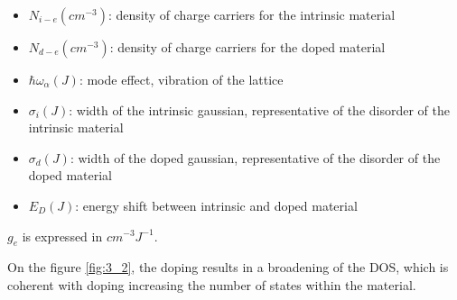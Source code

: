 \begin{itemize}
    \item $N_{i-e}(cm^{-3})$: density of charge carriers for the intrinsic material
    \item $N_{d-e}(cm^{-3})$: density of charge carriers for the doped material
    \item $\hbar \omega_\alpha(J)$: mode effect, vibration of the lattice
    \item $\sigma_i(J)$: width of the intrinsic gaussian, representative of the disorder of the intrinsic material
    \item $\sigma_d(J)$: width of the doped gaussian, representative of the disorder of the doped material
    \item $E_D(J)$: energy shift between intrinsic and doped material
\end{itemize}

$g_e$ is expressed in $cm^{-3} J^{-1}$.

On the figure \ref{fig:3_2}, the doping results in a broadening of the DOS, which is coherent with doping increasing the number of states within the material.

